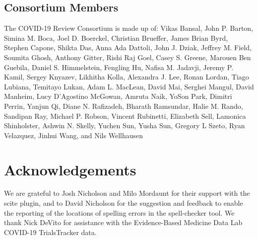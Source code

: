 \documentclass[sigconf]{acmart}
\begin{document}
\hypertarget{consortium-members}{%
\subsection{Consortium Members}\label{consortium-members}}

The COVID-19 Review Consortium is made up of: Vikas Bansal, John P. Barton, Simina M. Boca, Joel D. Boerckel, Christian Brueffer, James Brian Byrd, Stephen Capone, Shikta Das, Anna Ada Dattoli, John J. Dziak, Jeffrey M. Field, Soumita Ghosh, Anthony Gitter, Rishi Raj Goel, Casey S. Greene, Marouen Ben Guebila, Daniel S. Himmelstein, Fengling Hu, Nafisa M. Jadavji, Jeremy P. Kamil, Sergey Knyazev, Likhitha Kolla, Alexandra J. Lee, Ronan Lordan, Tiago Lubiana, Temitayo Lukan, Adam L. MacLean, David Mai, Serghei Mangul, David Manheim, Lucy D'Agostino McGowan, Amruta Naik, YoSon Park, Dimitri Perrin, Yanjun Qi, Diane N. Rafizadeh, Bharath Ramsundar, Halie M. Rando, Sandipan Ray, Michael P. Robson, Vincent Rubinetti, Elizabeth Sell, Lamonica Shinholster, Ashwin N. Skelly, Yuchen Sun, Yusha Sun, Gregory L Szeto, Ryan Velazquez, Jinhui Wang, and Nils Wellhausen

\hypertarget{acknowledgements}{%
\section*{Acknowledgements}\label{acknowledgements}}

We are grateful to Josh Nicholson and Milo Mordaunt for their support with the scite plugin, and to David Nicholson for the suggestion and feedback to enable the reporting of the locations of spelling errors in the spell-checker tool.
We thank Nick DeVito for assistance with the Evidence-Based Medicine Data Lab COVID-19 TrialsTracker data.


	\balance
	
\end{document}
